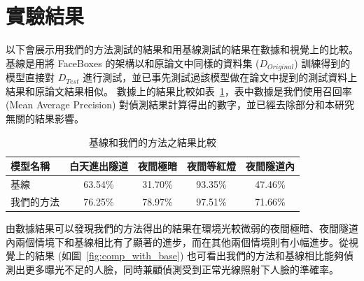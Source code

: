 \section{實驗結果}

以下會展示用我們的方法測試的結果和用基線測試的結果在數據和視覺上的比較。基線是用將 FaceBoxes 的架構以和原論文中同樣的資料集 ($D_{Original}$) 訓練得到的模型直接對 $D_{Test}$ 進行測試，並已事先測試過該模型做在論文中提到的測試資料上結果和原論文結果相似。
數據上的結果比較如表~\ref{table:baseline_compare}，表中數據是我們使用召回率 (Mean Average Precision) 對偵測結果計算得出的數字，並已經去除部分和本研究無關的結果影響。
\begin{table}[ht]
    \caption{基線和我們的方法之結果比較}
    \centering
    \begin{tabular}{l c c c c}
        \hline
        模型名稱 & 白天進出隧道 & 夜間極暗 & 夜間等紅燈 & 夜間隧道內 \\
        \hline
        基線 & 63.54\% & 31.70\% & 93.35\% & 47.46\% \\
        我們的方法 & 76.25\% & 78.97\% & 97.51\% & 71.66\% \\
        \hline
    \end{tabular}
    \label{table:baseline_compare}
\end{table}

由數據結果可以發現我們的方法得出的結果在環境光較微弱的夜間極暗、夜間隧道內兩個情境下和基線相比有了顯著的進步，而在其他兩個情境則有小幅進步。從視覺上的結果 (如圖~\ref{fig:comp_with_base}) 也可看出我們的方法和基線相比能夠偵測出更多曝光不足的人臉，同時兼顧偵測受到正常光線照射下人臉的準確率。

